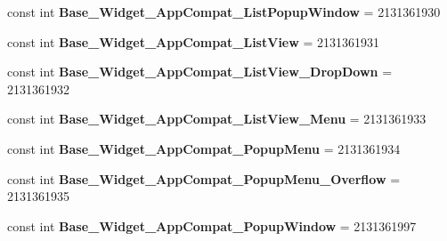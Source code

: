 \begin{DoxyCompactItemize}
\item 
\mbox{\label{class_pinned_app_1_1_droid_1_1_resource_1_1_style_a88f6365440d6d1f7ecc27959ffa29756}} 
const int {\bfseries Base\+\_\+\+Widget\+\_\+\+App\+Compat\+\_\+\+List\+Popup\+Window} = 2131361930
\item 
\mbox{\label{class_pinned_app_1_1_droid_1_1_resource_1_1_style_a7bc0c4220652c921647d001d17798f22}} 
const int {\bfseries Base\+\_\+\+Widget\+\_\+\+App\+Compat\+\_\+\+List\+View} = 2131361931
\item 
\mbox{\label{class_pinned_app_1_1_droid_1_1_resource_1_1_style_a363fdbff9a3e60c632e5bd724d8ec532}} 
const int {\bfseries Base\+\_\+\+Widget\+\_\+\+App\+Compat\+\_\+\+List\+View\+\_\+\+Drop\+Down} = 2131361932
\item 
\mbox{\label{class_pinned_app_1_1_droid_1_1_resource_1_1_style_a38802d643e7fbf5f34561d10957bcd2b}} 
const int {\bfseries Base\+\_\+\+Widget\+\_\+\+App\+Compat\+\_\+\+List\+View\+\_\+\+Menu} = 2131361933
\item 
\mbox{\label{class_pinned_app_1_1_droid_1_1_resource_1_1_style_a5448ab4b98947a77d0f92c6e976d94fd}} 
const int {\bfseries Base\+\_\+\+Widget\+\_\+\+App\+Compat\+\_\+\+Popup\+Menu} = 2131361934
\item 
\mbox{\label{class_pinned_app_1_1_droid_1_1_resource_1_1_style_af0f095150817841c739c238ad7fa4033}} 
const int {\bfseries Base\+\_\+\+Widget\+\_\+\+App\+Compat\+\_\+\+Popup\+Menu\+\_\+\+Overflow} = 2131361935
\item 
\mbox{\label{class_pinned_app_1_1_droid_1_1_resource_1_1_style_a26188f7efb09496939c90f7344b6a5af}} 
const int {\bfseries Base\+\_\+\+Widget\+\_\+\+App\+Compat\+\_\+\+Popup\+Window} = 2131361997
\item 
\mbox{\label{class_pinned_app_1_1_droid_1_1_resource_1_1_style_ae266c056a0d419cc18cd6c61c3f2a1c8}} 

\end{DoxyCompactItemize}
